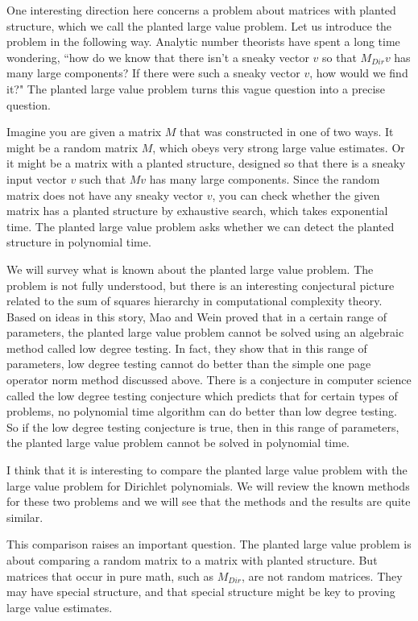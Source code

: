 \documentclass{amsart}
\begin{document}
One interesting direction here concerns a problem about matrices with planted structure,  which we call the planted large value problem.   Let us introduce the problem in the following way.
Analytic number theorists have spent a long time wondering, ``how do we know that there isn't a sneaky vector $v$ so that $M_{Dir} v$ has many large components?  If there were such a sneaky vector $v$,  how would we find it?"   The planted large value problem turns this vague question into a precise question.

Imagine you are given a matrix $M$ that was constructed in one of two ways.   It might be a random matrix $M$,  which obeys very strong large value estimates.  Or it might be a matrix with a planted structure,  designed so that there is a sneaky input vector $v$ such that $Mv$ has many large components.   Since the random matrix does not have any sneaky vector $v$,  you can check whether the given matrix has a planted structure by exhaustive search,  which takes exponential time.   The planted large value problem asks whether we can detect the planted structure in polynomial time.

We will survey what is known about the planted large value problem.   The problem is not fully understood,  but there is an interesting conjectural picture related to the sum of squares hierarchy in computational complexity theory.   Based on ideas in this story,  Mao and Wein \cite{MW} proved that in a certain range of parameters,  the planted large value problem cannot be solved using an algebraic method called low degree testing.
In fact,  they show that in this range of parameters,  low degree testing cannot do better than the simple one page operator norm method discussed above.    There is a conjecture in computer science called the low degree testing conjecture which predicts that for certain types of problems,  no polynomial time algorithm can do better than low degree testing.   So if the low degree testing conjecture is true,  then in this range of parameters, the planted large value problem cannot be solved in polynomial time.  

I think that it is interesting to compare the planted large value problem with the large value problem for Dirichlet polynomials.   We will review the known methods for these two problems and we will see that the methods and the results are quite similar. 

This comparison raises an important question.   The planted large value problem is about comparing a random matrix to a matrix with planted structure.   But matrices that occur in pure math,  such as $M_{Dir}$,  are not random matrices.   They may have special structure,  and that special structure might be key to proving large value estimates.
\end{document}
